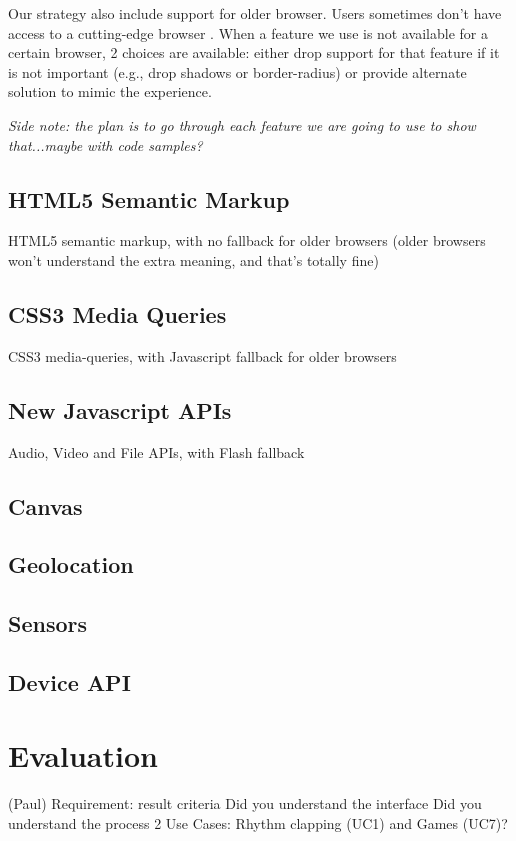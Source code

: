 \documentclass[runningheads,a4paper]{llncs}
\begin{document}
Our strategy also include support for older browser. Users sometimes don't have access to a cutting-edge browser  . When a feature we use is not available for a certain browser, 2 choices are available: either drop support for that feature if it is not important (e.g., drop shadows or border-radius) or provide alternate solution to mimic the experience.

\emph{Side note: the plan is to go through each feature we are going to use to show that...maybe with code samples?}

\subsection{HTML5 Semantic Markup} 

HTML5 semantic markup, with no fallback for older browsers (older browsers won't understand the extra meaning, and that's totally fine)

\subsection{CSS3 Media Queries} 

CSS3 media-queries, with Javascript fallback for older browsers

\subsection{New Javascript APIs}

 Audio, Video and File APIs, with Flash fallback

\subsection{Canvas}

\subsection{Geolocation}

\subsection{Sensors}

\subsection{Device API}


\section{Evaluation}
(Paul)
Requirement: result criteria
Did you understand the interface
Did you understand the process
2 Use Cases: Rhythm clapping (UC1) and Games (UC7)?
\end{document}
